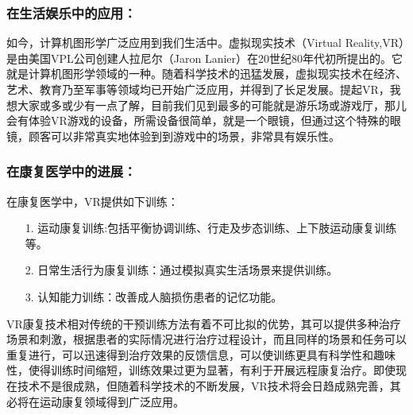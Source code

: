 \documentclass{article}
\begin{document}
\subsubsection{在生活娱乐中的应用：}\par
如今，计算机图形学广泛应用到我们生活中。虚拟现实技术（Virtual Reality,VR）是由美国VPL公司创建人拉尼尔（Jaron Lanier）在20世纪80年代初所提出的。它就是计算机图形学领域的一种。随着科学技术的迅猛发展，虚拟现实技术在经济、艺术、教育乃至军事等领域均已开始广泛应用，并得到了长足发展。提起VR，我想大家或多或少有一点了解，目前我们见到最多的可能就是游乐场或游戏厅，那儿会有体验VR游戏的设备，所需设备很简单，就是一个眼镜，但通过这个特殊的眼镜，顾客可以非常真实地体验到到游戏中的场景，非常具有娱乐性。
\subsubsection{在康复医学中的进展：\citep{李红玲2013虚拟现实技术及其在康复医学中的应用进展}}\par
在康复医学中，VR提供如下训练：
\begin{itemize}
\item[1.]运动康复训练:包括平衡协调训练、行走及步态训练、上下肢运动康复训练等。
\item[2.]日常生活行为康复训练：通过模拟真实生活场景来提供训练。
\item[3.]认知能力训练：改善成人脑损伤患者的记忆功能。
\end{itemize}
\par
VR康复技术相对传统的干预训练方法有着不可比拟的优势，其可以提供多种治疗场景和刺激，根据患者的实际情况进行治疗过程设计，而且同样的场景和任务可以重复进行，可以迅速得到治疗效果的反馈信息，可以使训练更具有科学性和趣味性，使得训练时间缩短，训练效果过更为显著，有利于开展远程康复治疗。即使现在技术不是很成熟，但随着科学技术的不断发展，VR技术将会日趋成熟完善，其必将在运动康复领域得到广泛应用。
\end{document}
